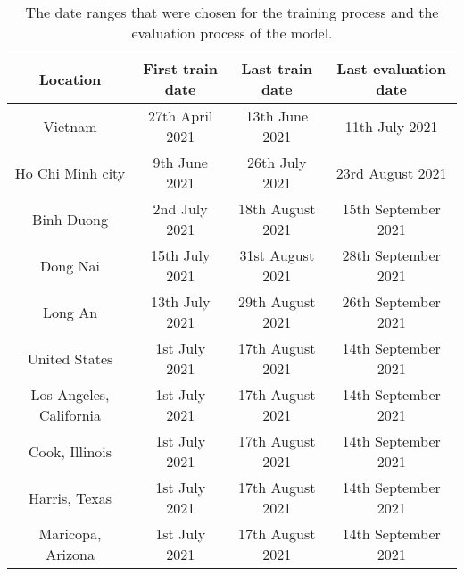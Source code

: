 \begin{table}[h]
    \centering
    \begin{tabular}{| c | c | c | c |}
        Location & First train date & Last train date & Last evaluation date \\
        \hline\hline
        Vietnam & 27th April 2021 & 13th June 2021 & 11th July 2021 \\
        \hline
        Ho Chi Minh city & 9th June 2021 & 26th July 2021 & 23rd August 2021 \\
        \hline
        Binh Duong & 2nd July 2021 & 18th August 2021 & 15th September 2021 \\
        \hline
        Dong Nai & 15th July 2021 & 31st August 2021 & 28th September 2021 \\
        \hline
        Long An & 13th July 2021 & 29th August 2021 & 26th September 2021 \\
        \hline
        United States & 1st July 2021 & 17th August 2021 & 14th September 2021 \\
        \hline
        Los Angeles, California & 1st July 2021 & 17th August 2021 & 14th September 2021 \\
        \hline
        Cook, Illinois & 1st July 2021 & 17th August 2021 & 14th September 2021 \\
        \hline
        Harris, Texas & 1st July 2021 & 17th August 2021 & 14th September 2021 \\
        \hline
        Maricopa, Arizona & 1st July 2021 & 17th August 2021 & 14th September 2021 \\
        \hline
    \end{tabular}
    \caption{The date ranges that were chosen for the training process and the evaluation process of the model.}
    \label{tab:chosen-dataset-dates}
\end{table}

